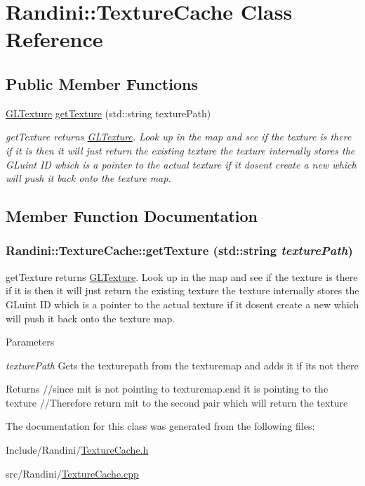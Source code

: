 \hypertarget{classRandini_1_1TextureCache}{
\section{Randini::TextureCache Class Reference}
\label{classRandini_1_1TextureCache}
}
\subsection*{Public Member Functions}
\begin{DoxyCompactItemize}
\item 
\hyperlink{structRandini_1_1GLTexture}{GLTexture} \hyperlink{classRandini_1_1TextureCache_a616aab3abb7b12c93ab9204432e9512d}{getTexture} (std::string texturePath)
\begin{DoxyCompactList}\small\item\em getTexture returns \hyperlink{structRandini_1_1GLTexture}{GLTexture}. Look up in the map and see if the texture is there if it is then it will just return the existing texture the texture internally stores the GLuint ID which is a pointer to the actual texture if it dosent create a new which will push it back onto the texture map. \item\end{DoxyCompactList}\end{DoxyCompactItemize}


\subsection{Member Function Documentation}
\hypertarget{classRandini_1_1TextureCache_a616aab3abb7b12c93ab9204432e9512d}{
\subsubsection[{getTexture}]{ Randini::TextureCache::getTexture (std::string {\em texturePath})}}
\label{classRandini_1_1TextureCache_a616aab3abb7b12c93ab9204432e9512d}


getTexture returns \hyperlink{structRandini_1_1GLTexture}{GLTexture}. Look up in the map and see if the texture is there if it is then it will just return the existing texture the texture internally stores the GLuint ID which is a pointer to the actual texture if it dosent create a new which will push it back onto the texture map. 
\begin{DoxyParams}{Parameters}
\item[{\em texturePath}]Gets the texturepath from the texturemap and adds it if its not there\end{DoxyParams}
\begin{DoxyReturn}{Returns}
//since mit is not pointing to texturemap.end it is pointing to the texture //Therefore return mit to the second pair which will return the texture 
\end{DoxyReturn}


The documentation for this class was generated from the following files:\begin{DoxyCompactItemize}
\item 
Include/Randini/\hyperlink{TextureCache_8h}{TextureCache.h}\item 
src/Randini/\hyperlink{TextureCache_8cpp}{TextureCache.cpp}\end{DoxyCompactItemize}
